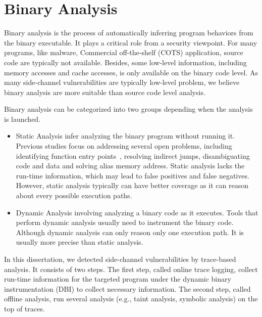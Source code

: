 \section{Binary Analysis}
Binary analysis is the process of automatically inferring program behaviors from
the binary executable.
It plays a critical role from a security viewpoint. For many programs, like malware, Commercial off-the-shelf (COTS) application, source code are typically not
available. Besides, some low-level information, including memory accesses and cache
accesses, is only available on the binary code level. As many side-channel vulnerabilities
are typically low-level problem, we believe binary analysis are more suitable than
source code level analysis.

Binary analysis can be categorized into two groups depending when the analysis is
launched.
\begin{itemize}
    \item Static Analysis infer analyzing the binary program without running it. Previous studies focus on addressing several open problems, including identifying
    function entry points~\cite{184521, Wang17a}, resolving indirect jumps, disambiguating code and data and solving alias memory address. Static analysis
    lacks the run-time information, which may lead to false positives and false 
    negatives. However, static analysis typically can have better coverage as it can
    reason about every possible execution paths.
    \item Dynamic Analysis involving analyzing a binary code as it executes. Tools
    that perform dynamic analysis usually need to instrument the binary code.  
    Although dynamic analysis can only reason only one execution path. It is usually more precise than static analysis.
\end{itemize}

In this dissertation, we detected side-channel vulnerabilities by trace-based analysis.
It consists of two steps. The first step, called online trace logging, collect run-time
information for the targeted program under the dynamic binary instrumentation (DBI)
to collect necessary information. The second step, called offline analysis, run
several analysis (e.g., taint analysis, symbolic analysis) on the top of traces.  

